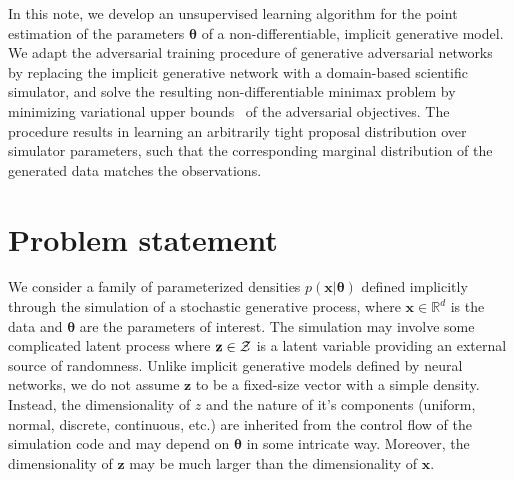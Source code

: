 \documentclass[twocolumn,superscriptaddress,aps]{revtex4-1}
\newcommand{\bftheta}{{\bm \theta}}
\newcommand{\bfx}{\mathbf{x}}
\newcommand{\bfz}{\mathbf{z}}
\theoremstyle{plain}
\begin{document}
In this note, we develop an unsupervised learning algorithm for the point
estimation of the parameters $\bftheta$ of a non-differentiable, implicit
generative model. We adapt the adversarial
training procedure of generative adversarial
networks~\cite{goodfellow2014generative} by replacing the implicit generative
network with a domain-based scientific simulator, and solve the resulting
non-differentiable minimax problem by minimizing variational upper
bounds~\citep{2011arXiv1106.4487W,2012arXiv1212.4507S} of the adversarial
objectives. The procedure results in learning an arbitrarily tight
proposal distribution over simulator parameters, such that the corresponding
marginal distribution of the generated data matches the observations.





\section{Problem statement}
\label{sec:problem}

We consider a family of parameterized densities $p(\mathbf{x}|\bftheta)$
defined implicitly through the simulation of a stochastic generative process,
where $\mathbf{x} \in \mathbb{R}^d$ is the data and $\bftheta$ are the
parameters of interest. The simulation may involve some complicated latent
process
where $\bfz \in {\cal Z}$ is a latent variable providing an external
source of randomness. 
Unlike implicit generative models defined by neural networks, we do not assume $\bfz$ to
be a fixed-size vector with a simple density. Instead, the dimensionality of $z$ and the nature of it's components (uniform, normal, discrete, continuous, etc.) are inherited from the control flow of the simulation code and may depend on $\bftheta$ in some intricate way. Moreover, the dimensionality of $\bfz$ may be much larger than the dimensionality of $\bfx$.
\end{document}
